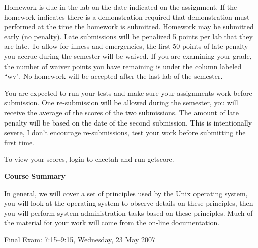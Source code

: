 Homework is due in the lab on the date indicated on the assignment.
If the homework indicates there is a demonstration required
that demonstration must performed at the time the homework is submitted.
Homework may be submitted early (no penalty).
Late submissions will be penalized 5 points per lab that they are late.
To allow for illness and emergencies,
the first 50 points of late penalty you
accrue during the semester will be waived.
If you are examining your grade, the number of waiver points you have
remaining is under the column labeled ``{\ltt{}wv}".
No homework will be accepted after the last lab of the semester.

You are expected to run your tests and make sure your assignments work
before submission.
One re-submission will be allowed during the semester, you will receive
the average of the scores of the two submissions. The amount of late
penalty will be based on the date of the second submission.
This is intentionally severe, I don't encourage re-submissions, test your
work before submitting the first time.

To view your scores, login to {\ltt{}cheetah} and run {\ltt{}getscore}.

\vskip 5pt
\centerline{\bf Course Summary}

In general, we will cover a set of principles used by the Unix operating system,
you will look at the operating system to observe details on these principles,
then you will perform system administration tasks based on these principles.
Much of the material for your work will come from the on-line documentation.

\vskip 5pt
Final Exam: 
7:15--9:15, Wednesday, 23 May 2007

\def\week#1{\par\hangindent 0.7in {\indent\llap{\bf #1 \enspace}
\ignorespaces}}

\bye
